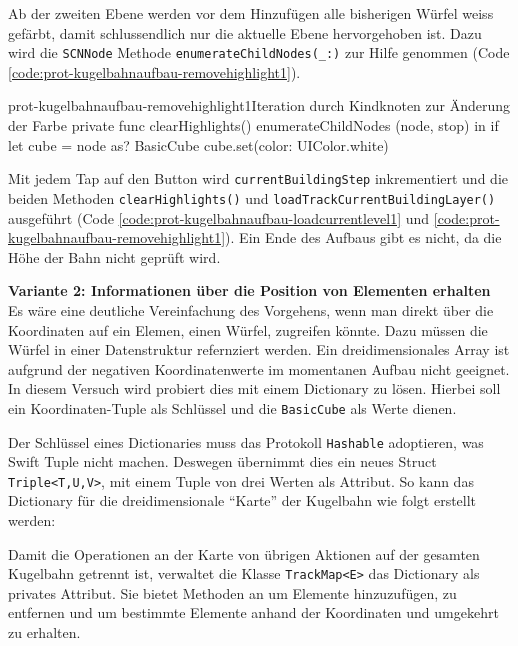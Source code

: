 \begin{description}
	Ab der zweiten Ebene werden vor dem Hinzufügen alle bisherigen Würfel weiss gefärbt, damit schlussendlich nur die aktuelle Ebene hervorgehoben ist. Dazu wird die \texttt{SCNNode} Methode \texttt{enumerateChildNodes(\_:)} zur Hilfe genommen (Code \ref{code:prot-kugelbahnaufbau-removehighlight1}).

	\begin{code}{prot-kugelbahnaufbau-removehighlight1}{Iteration durch Kindknoten zur Änderung der Farbe}
		private func clearHighlights() {
			enumerateChildNodes { (node, stop) in
				if let cube = node as? BasicCube {
					cube.set(color: UIColor.white)
				}
			}
		}
	\end{code}

	Mit jedem Tap auf den Button wird \texttt{currentBuildingStep} inkrementiert und die beiden Methoden \texttt{clearHighlights()} und \texttt{loadTrackCurrentBuildingLayer()} ausgeführt (Code \ref{code:prot-kugelbahnaufbau-loadcurrentlevel1} und \ref{code:prot-kugelbahnaufbau-removehighlight1}). Ein Ende des Aufbaus gibt es nicht, da die Höhe der Bahn nicht geprüft wird.

	\textbf{Variante 2: Informationen über die Position von Elementen erhalten}\\
	Es wäre eine deutliche Vereinfachung des Vorgehens, wenn man direkt über die Koordinaten auf ein Elemen, einen Würfel, zugreifen könnte. Dazu müssen die Würfel in einer Datenstruktur refernziert werden. Ein dreidimensionales Array ist aufgrund der negativen Koordinatenwerte im momentanen Aufbau nicht geeignet. In diesem Versuch wird probiert dies mit einem Dictionary zu lösen. Hierbei soll ein Koordinaten-Tuple als Schlüssel und die \texttt{BasicCube} als Werte dienen.
	
	Der Schlüssel eines Dictionaries muss das Protokoll \texttt{Hashable} adoptieren, was Swift Tuple nicht machen. Deswegen übernimmt dies ein neues Struct \texttt{Triple<T,U,V>}, mit einem Tuple von drei Werten als Attribut. So kann das Dictionary für die dreidimensionale "`Karte"' der Kugelbahn wie folgt erstellt werden:


	Damit die Operationen an der Karte von übrigen Aktionen auf der gesamten Kugelbahn getrennt ist, verwaltet die Klasse \texttt{TrackMap<E>} das Dictionary als privates Attribut. Sie bietet Methoden an um Elemente hinzuzufügen, zu entfernen und um bestimmte Elemente anhand der Koordinaten und umgekehrt zu erhalten.


\end{description}
